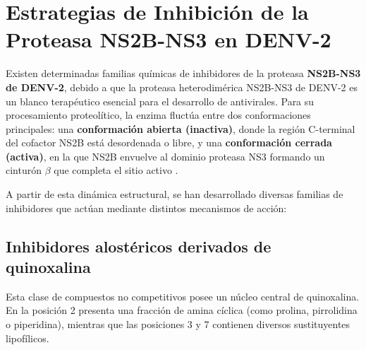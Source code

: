 \section{Estrategias de Inhibición de la Proteasa NS2B-NS3 en DENV-2}
Existen determinadas familias químicas de inhibidores de la proteasa \textbf{NS2B-NS3 de DENV-2}, debido a que la proteasa heterodimérica NS2B-NS3 de DENV-2 es un blanco terapéutico esencial para el desarrollo de antivirales. Para su procesamiento proteolítico, la enzima fluctúa entre dos conformaciones principales: una \textbf{conformación abierta (inactiva)}, donde la región C-terminal del cofactor NS2B está desordenada o libre, y una \textbf{conformación cerrada (activa)}, en la que NS2B envuelve al dominio proteasa NS3 formando un cinturón $\beta$ que completa el sitio activo \cite{chandramouli2010serotype, maus2021sar}.

A partir de esta dinámica estructural, se han desarrollado diversas familias de inhibidores que actúan mediante distintos mecanismos de acción:

\vspace{0.5em}

\subsection{Inhibidores alostéricos derivados de quinoxalina}
Esta clase de compuestos no competitivos posee un núcleo central de quinoxalina. En la posición 2 presenta una fracción de amina cíclica (como prolina, pirrolidina o piperidina), mientras que las posiciones 3 y 7 contienen diversos sustituyentes lipofílicos.

